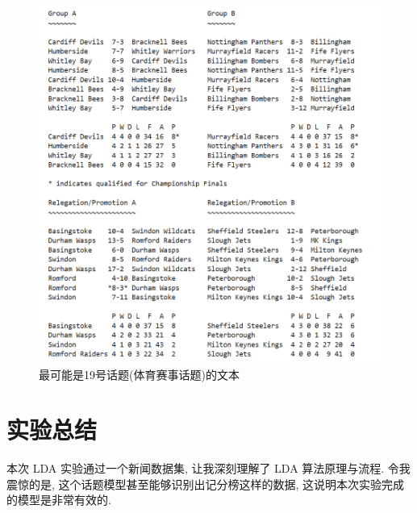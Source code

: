 \documentclass[UTF8]{article}
\begin{document}
\begin{minipage}{\linewidth/2}
\begin{figure}[H]
	\centering
	\includegraphics[width=\linewidth]{image/topic19doc.png}
	\caption{最可能是19号话题(体育赛事话题)的文本}
	\label{topic19doc}
\end{figure}
\end{minipage}

\section{实验总结}
本次 LDA 实验通过一个新闻数据集, 让我深刻理解了 LDA 算法原理与流程. 令我震惊的是, 这个话题模型甚至能够识别出记分榜这样的数据, 这说明本次实验完成的模型是非常有效的.



	
\end{document}
